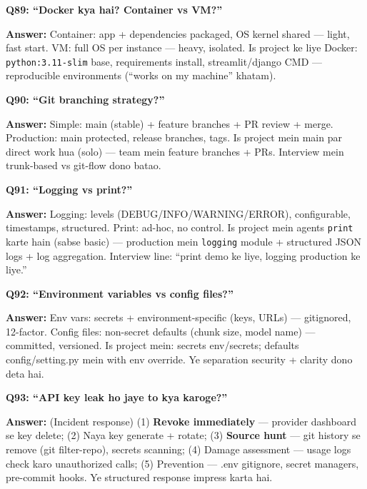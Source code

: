 \begin{interviewbox}
\textbf{Q89: ``Docker kya hai? Container vs VM?''}

\textbf{Answer:} Container: app + dependencies packaged, OS kernel shared --- light, fast start. VM: full OS per instance --- heavy, isolated. Is project ke liye Docker: \texttt{python:3.11-slim} base, requirements install, streamlit/django CMD --- reproducible environments (``works on my machine'' khatam).
\end{interviewbox}

\begin{interviewbox}
\textbf{Q90: ``Git branching strategy?''}

\textbf{Answer:} Simple: main (stable) + feature branches + PR review + merge. Production: main protected, release branches, tags. Is project mein main par direct work hua (solo) --- team mein feature branches + PRs. Interview mein trunk-based vs git-flow dono batao.
\end{interviewbox}

\begin{interviewbox}
\textbf{Q91: ``Logging vs print?''}

\textbf{Answer:} Logging: levels (DEBUG/INFO/WARNING/ERROR), configurable, timestamps, structured. Print: ad-hoc, no control. Is project mein agents \texttt{print} karte hain (sabse basic) --- production mein \texttt{logging} module + structured JSON logs + log aggregation. Interview line: ``print demo ke liye, logging production ke liye.''
\end{interviewbox}

\begin{interviewbox}
\textbf{Q92: ``Environment variables vs config files?''}

\textbf{Answer:} Env vars: secrets + environment-specific (keys, URLs) --- gitignored, 12-factor. Config files: non-secret defaults (chunk size, model name) --- committed, versioned. Is project mein: secrets env/secrets; defaults config/setting.py mein with env override. Ye separation security + clarity dono deta hai.
\end{interviewbox}

\begin{interviewbox}
\textbf{Q93: ``API key leak ho jaye to kya karoge?''}

\textbf{Answer:} (Incident response) (1) \textbf{Revoke immediately} --- provider dashboard se key delete; (2) Naya key generate + rotate; (3) \textbf{Source hunt} --- git history se remove (git filter-repo), secrets scanning; (4) Damage assessment --- usage logs check karo unauthorized calls; (5) Prevention --- .env gitignore, secret managers, pre-commit hooks. Ye structured response impress karta hai.
\end{interviewbox}

